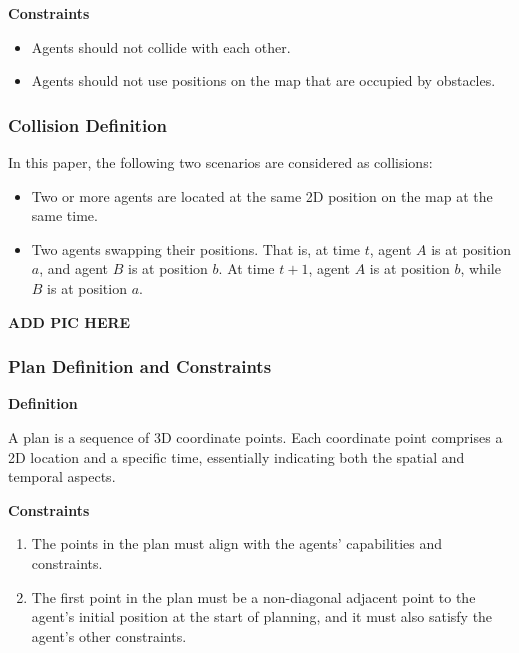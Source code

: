 \textbf{Constraints}

\begin{itemize}
    \item Agents should not collide with each other.
    \item Agents should not use positions on the map that are occupied by obstacles.
\end{itemize}

\subsubsection{Collision Definition}

In this paper, the following two scenarios are considered as collisions:
\begin{itemize}
    \item Two or more agents are located at the same 2D position on the map at the same time.
    \item Two agents swapping their positions. That is, at time $t$, agent $A$ is at position $a$, and agent $B$ is at position $b$. At time $t+1$, agent $A$ is at position $b$, while $B$ is at position $a$.
\end{itemize}

\textbf{ADD PIC HERE} %

\subsubsection{Plan Definition and Constraints}

\textbf{Definition}

A plan is a sequence of 3D coordinate points. Each coordinate point comprises a 2D location and a specific time, essentially indicating both the spatial and temporal aspects.


\textbf{Constraints}

\begin{enumerate}
    \item The points in the plan must align with the agents' capabilities and constraints.
    \item The first point in the plan must be a non-diagonal adjacent point to the agent's initial position at the start of planning, and it must also satisfy the agent's other constraints.
\end{enumerate}


